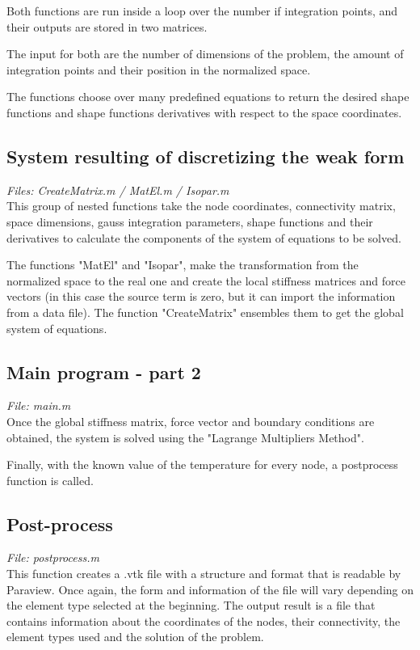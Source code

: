 \documentclass[paper=a4, fontsize=11pt]{article} %
\numberwithin{equation}{section} %
\numberwithin{figure}{section} %
\numberwithin{table}{section} %
\begin{document}
Both functions are run inside a loop over the number if integration points, and their outputs are stored in two matrices.

The input for both are the number of dimensions of the problem, the amount of integration points and their position in the normalized space.

The functions choose over many predefined equations to return the desired shape functions and shape functions derivatives with respect to the space coordinates.

\subsection{\textbf{System resulting of discretizing the weak form}}
\textit{Files: CreateMatrix.m / MatEl.m / Isopar.m }\\

This group of nested functions take the node coordinates, connectivity matrix, space dimensions, gauss integration parameters, shape functions and their derivatives to calculate the components of the system of equations to be solved. 

The functions "MatEl" and "Isopar", make the transformation from the normalized space to the real one and create the local stiffness matrices and force vectors (in this case the source term is zero, but it can import the information from a data file). The function "CreateMatrix" ensembles them to get the global system of equations.



\subsection{\textbf{Main program - part 2}}
\textit{File: main.m }\\

Once the global stiffness matrix, force vector and boundary conditions are obtained, the system is solved using the "Lagrange Multipliers Method".

Finally, with the known value of the temperature for every node, a postprocess function is called.

\subsection{\textbf{Post-process}}
\textit{File: postprocess.m }\\

This function creates a .vtk file with a structure and format that is readable by Paraview. Once again, the form and information of the file will vary depending on the element type selected at the beginning.
The output result is a file that contains information about the coordinates of the nodes, their connectivity, the element types used and the solution of the problem.
\end{document}
